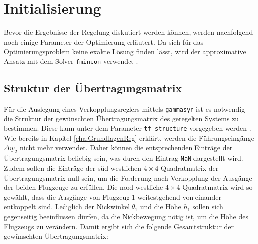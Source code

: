 \section{Initialisierung}
Bevor die Ergebnisse der Regelung diskutiert werden können, werden nachfolgend noch einige Parameter der Optimierung erläutert. Da sich für das Optimierungsproblem keine exakte Lösung finden lässt, wird der approximative Ansatz mit dem Solver \texttt{fmincon} verwendet \cite{Schaub}. 

\subsection{Struktur der Übertragungsmatrix}
Für die Auslegung eines Verkopplungsreglers mittels \texttt{gammasyn} ist es notwendig die Struktur der gewünschten Übertragungsmatrix des geregelten Systems zu bestimmen. Diese kann unter dem Parameter \texttt{tf\_structure} vorgegeben werden \cite{gammaDoku}. Wie bereits in Kapitel \ref{cha:GrundlagenReg} erklärt, werden die Führungseingänge $\Delta\underline{w}_2$ nicht mehr verwendet. Daher können die entsprechenden Einträge der Übertragungsmatrix beliebig sein, was durch den Eintrag \texttt{NaN} dargestellt wird. Zudem sollen die Einträge der süd-westlichen $4\times4$-Quadratmatrix der Übertragungsmatrix null sein, um die Forderung nach Verkopplung der Ausgänge der beiden Flugzeuge zu erfüllen. Die nord-westliche $4\times4$-Quadratmatrix wird so gewählt, dass die Ausgänge von Flugzeug 1 weitestgehend von einander entkoppelt sind. Lediglich der Nickwinkel $\theta_1$ und die Höhe $h_1$ sollen sich gegenseitig beeinflussen dürfen, da die Nickbewegung nötig ist, um die Höhe des Flugzeugs zu verändern. Damit ergibt sich die folgende Gesamtstruktur der gewünschten Übertragungsmatrix:
